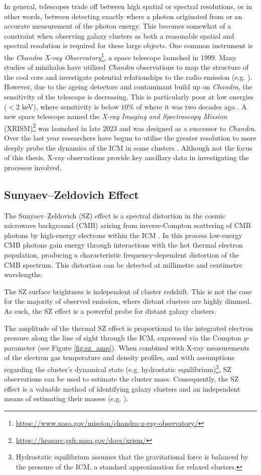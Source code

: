 In general, telescopes trade off between high spatial or spectral resolutions, or in other words, between detecting exactly where a photon originated from or an accurate measurement of the photon energy. This becomes somewhat of a constraint when observing galaxy clusters as both a reasonable spatial and spectral resolution is required for these large objects. One common instrument is the \textit{Chandra X-ray Observatory}\footnote{\url{https://www.nasa.gov/mission/chandra-x-ray-observatory/}}, a space telescope launched in 1999. Many studies of minihalos have utilised \textit{Chandra} observations to map the structure of the cool core and investigate potential relationships to the radio emission (e.g. \citealp{Giacintucci2024}). However, due to the ageing detectors and contaminant build up on \textit{Chandra}, the sensitivity of the telescope is decreasing. This is particularly poor at low energies ($<2$ keV), where sensitivity is below $10$\% of where it was two decades ago \citep{Grant2024}. A new space telescope named the \textit{X-ray Imaging and Spectroscopy Mission} (XRISM)\footnote{\url{https://heasarc.gsfc.nasa.gov/docs/xrism/}} was launched in late 2023 and was designed as a successor to \textit{Chandra}. Over the last year researchers have begun to utilise the greater resolution to more deeply probe the dynamics of the ICM in some clusters \citep{Sarkar2025, XRISM2025}. Although not the focus of this thesis, X-ray observations provide key ancillary data in investigating the processes involved.

\subsection{Sunyaev--Zeldovich Effect}
The Sunyaev--Zeldovich (SZ) effect is a spectral distortion in the cosmic microwave background (CMB) arising from inverse-Compton scattering of CMB photons by high-energy electrons within the ICM \citep{Zeldovich1969}. In this process low-energy CMB photons gain energy through interactions with the hot thermal electron population, producing a characteristic frequency-dependent distortion of the CMB spectrum. This distortion can be detected at millimetre and centimetre wavelengths. 

The SZ surface brightness is independent of cluster redshift. This is not the case for the majority of observed emission, where distant clusters are highly dimmed. As such, the SZ effect is a powerful probe for distant galaxy clusters.

The amplitude of the thermal SZ effect is proportional to the integrated electron pressure along the line of sight through the ICM, expressed via the Compton $y$-parameter (see Figure \ref{fig:sz_amp}). When combined with X-ray measurements of the electron gas temperature and density profiles, and with assumptions regarding the cluster's dynamical state (e.g. hydrostatic equilibrium)\footnote{Hydrostatic equilibrium assumes that the gravitational force is balanced by the pressure of the ICM, a standard approximation for relaxed clusters.}, SZ observations can be used to estimate the cluster mass. Consequently, the SZ effect is a valuable method of identifying galaxy clusters and an independent means of estimating their masses (e.g. \citealp{Planck2016}).

